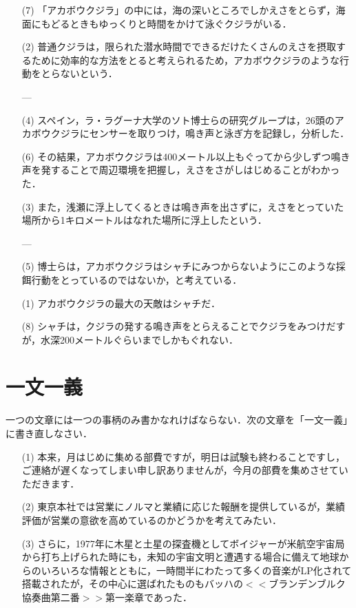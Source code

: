 \documentclass[11pt, a4paper]{jsarticle}
\begin{document}
\begin{itemize}
    \item[(7)]「アカボウクジラ」の中には，海の深いところでしかえさをとらず，海面にもどるときもゆっくりと時間をかけて泳ぐクジラがいる．
    \item[(2)]普通クジラは，限られた潜水時間でできるだけたくさんのえさを摂取するために効率的な方法をとると考えられるため，アカボウクジラのような行動をとらないという．
    \item[] ---
    \item[(4)]スペイン，ラ・ラグーナ大学のソト博士らの研究グループは，26頭のアカボウクジラにセンサーを取りつけ，鳴き声と泳ぎ方を記録し，分析した．
    \item[(6)]その結果，アカボウクジラは400メートル以上もぐってから少しずつ鳴き声を発することで周辺環境を把握し，えさをさがしはじめることがわかった．
    \item[(3)]また，浅瀬に浮上してくるときは鳴き声を出さずに，えさをとっていた場所から1キロメートルはなれた場所に浮上したという．
    \item[] ---
    \item[(5)]博士らは，アカボウクジラはシャチにみつからないようにこのような採餌行動をとっているのではないか，と考えている．
    \item[(1)]アカボウクジラの最大の天敵はシャチだ．
    \item[(8)]シャチは，クジラの発する鳴き声をとらえることでクジラをみつけだすが，水深200メートルぐらいまでしかもぐれない．
\end{itemize}

\newpage
\section{一文一義}
一つの文章には一つの事柄のみ書かなれけばならない．次の文章を「一文一義」に書き直しなさい．
\begin{itemize}
    \item[(1)] 本来，月はじめに集める部費ですが，明日は試験も終わることですし，ご連絡が遅くなってしまい申し訳ありませんが，今月の部費を集めさせていただきます．
    \item[(2)] 東京本社では営業にノルマと業績に応じた報酬を提供しているが，業績評価が営業の意欲を高めているのかどうかを考えてみたい．
    \item[(3)] さらに，1977年に木星と土星の探査機としてボイジャーが米航空宇宙局から打ち上げられた時にも，未知の宇宙文明と遭遇する場合に備えて地球からのいろいろな情報とともに，一時間半にわたって多くの音楽がLP化されて搭載されたが，その中心に選ばれたものもバッハの$<<$ブランデンブルク協奏曲第二番$>>$第一楽章であった．
\end{itemize}
\end{document}
